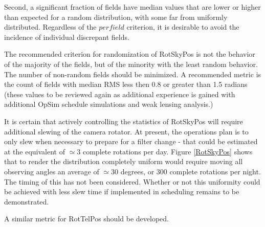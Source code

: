 Second, a significant fraction of fields  have median values that are
lower or higher than expected for a random distribution, with some far
from uniformly distributed.  Regardless of the $per field$ criterion,
it is desirable to avoid the incidence of individual discrepant
fields.

The recommended criterion for randomization of RotSkyPos is not the
behavior of the majority of the fields, but of the minority with the
least random behavior.  The number of non-random fields should be
minimized.  A recommended metric is the count of fields with median
RMS less then 0.8 or greater than 1.5 radians (these values to be
reviewed again as additional experience is gained with additional
OpSim schedule simulations and weak lensing analysis.)

It is certain that actively controlling the statistics of RotSkyPos
will require additional slewing of the camera rotator.  At present,
the operations plan is to only slew when necessary to prepare for a
filter change - that could be estimated at the equivalent of $\simeq
3$ complete rotations per day.  Figure \ref{RotSkyPos} shows that to
render the distribution completely uniform would require moving all
observing angles an average of $\simeq 30$ degrees, or 300 complete
rotations per night.  The timing of this has not been considered.
Whether or not this uniformity could be achieved with less slew time
if implemented in scheduling remains to be demonstrated.

A similar metric for RotTelPos should be developed.
